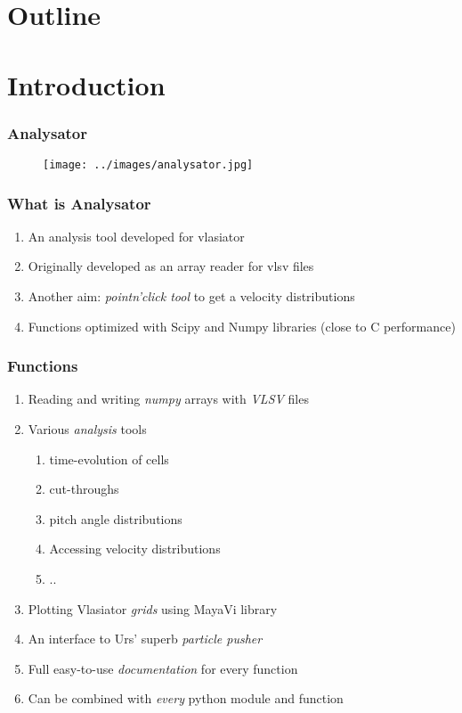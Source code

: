 \documentclass{beamer}
\begin{document}
\section*{Outline}
\begin{frame}
 \tableofcontents
\end{frame}

\section{Introduction}
\begin{frame}
 \frametitle{Analysator}
 \begin{figure}
  \centering
  \texttt{[image: ../images/analysator.jpg]}
  \label{fig:mayavi_example}
 \end{figure}
\end{frame}

\begin{frame}
 \frametitle{What is Analysator}
 \begin{enumerate}
  \item An analysis tool developed for vlasiator
  \item Originally developed as an array reader for vlsv files
  \item Another aim: \emph{pointn'click tool} to get a velocity distributions
  \item Functions optimized with Scipy and Numpy libraries (close to C performance)
 \end{enumerate}
\end{frame}

\begin{frame}
 \frametitle{Functions}
 \begin{enumerate}
  \item Reading and writing \emph{numpy} arrays with \emph{VLSV} files
  \item Various \emph{analysis} tools
  \begin{enumerate}
   \item time-evolution of cells
   \item cut-throughs
   \item pitch angle distributions
   \item Accessing velocity distributions
   \item ..
  \end{enumerate}
  \item Plotting Vlasiator \emph{grids} using MayaVi library
  \item An interface to Urs' superb \emph{particle pusher}
  \item Full easy-to-use \emph{documentation} for every function
  \item Can be combined with \emph{every} python module and function
 \end{enumerate}
\end{frame}
\end{document}
